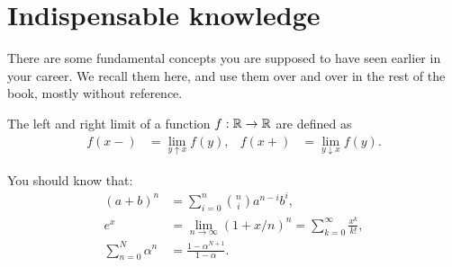 \documentclass[stochastic-or.tex]{subfiles}
\begin{document}
\section{Indispensable knowledge}
\label{sec:indep-knowl}




There are some fundamental concepts you are supposed to have seen earlier in your career.
We recall them here, and use them over and over in the rest of the book, mostly without reference.


The left and right limit of a function $f: \mathbb{R}\to \mathbb{R}$ are defined as
 \begin{align}
 f(x-) &= \lim_{y\uparrow x} f(y), &
 f(x+) &= \lim_{y\downarrow x} f(y).\label{eq:5}
\end{align}



You should know that:
\begin{subequations}
 \begin{align}
 (a+b)^n &= \sum_{i=0}^n {n \choose i} a^{n-i} b^i, \label{eq:71}\\
e^x &= \lim_{n\to\infty} (1+x/n)^n = \sum_{k=0}^{\infty} \frac{x^k}{k!}, \label{eq:76}\\
 \sum_{n=0}^N \alpha^n &= \frac{1-\alpha^{N+1}}{1-\alpha}. \label{eq:61}
\end{align}
\end{subequations}
\end{document}
